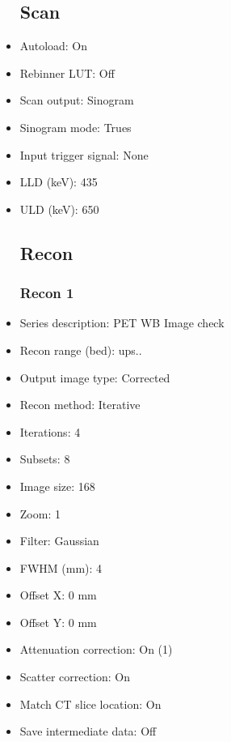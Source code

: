 \documentclass[12pt]{article}
\begin{document}
\begin{itemize}
\subsection{Scan}
\item Autoload: On
\item Rebinner LUT: Off
\item Scan output: Sinogram
\item Sinogram mode: Trues
\item Input trigger signal: None
\item LLD (keV): 435
\item ULD (keV): 650
\subsection{Recon}

\subsubsection{Recon 1}
\item Series description: PET WB Image check
\item Recon range (bed): ups..
\item Output image type: Corrected
\item Recon method: Iterative
\item Iterations: 4
\item Subsets: 8
\item Image size: 168
\item Zoom: 1
\item Filter: Gaussian
\item FWHM (mm): 4
\item Offset X: 0 mm
\item Offset Y: 0 mm
\item Attenuation correction: On (1)
\item Scatter correction: On
\item Match CT slice location: On
\item Save intermediate data: Off

\end{itemize}
\end{document}
